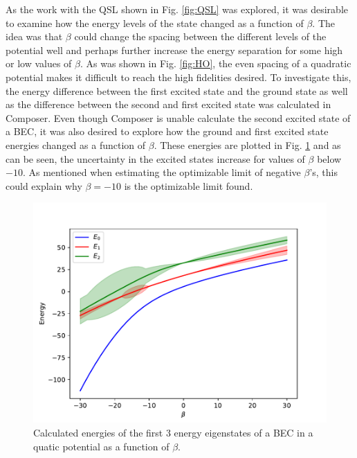 \documentclass[a4paper, twocolumn]{revtex4-1}
\begin{document}
As the work with the QSL shown in Fig. \ref{fig:QSL} was explored, it was desirable to examine how the energy levels of the state changed as a function of $\beta$. The idea was that $\beta$ could change the spacing between the different levels of the potential well and perhaps further increase the energy separation for some high or low values of $\beta$. As was shown in Fig. \ref{fig:HO}, the even spacing of a quadratic potential makes it difficult to reach the high fidelities desired. To investigate this, the energy difference between the first excited state and the ground state as well as the difference between the second and first excited state was calculated in Composer. %
Even though Composer is unable calculate the second excited state of a BEC, it was also desired to explore how the ground and first excited state energies changed as a function of $\beta$. These energies are plotted in Fig. \ref{fig:energyLevels} and as can be seen, the uncertainty in the excited states increase for values of $\beta$ below $-10$. As mentioned when estimating the optimizable limit of negative $\beta$'s, this could explain why $\beta=-10$ is the optimizable limit found.\\

\begin{figure}
	\includegraphics[width=\columnwidth]{graphics/stateAnalysis/Energylevels.pdf}
	\caption{Calculated energies of the first 3 energy eigenstates of a BEC in a quatic potential as a function of $\beta$.}
	\label{fig:energyLevels}
\end{figure}
\end{document}
